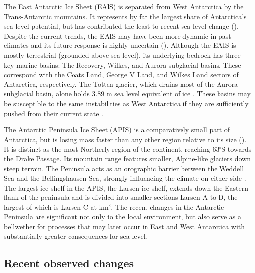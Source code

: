 The East Antarctic Ice Sheet (EAIS) is separated from West Antarctica by the Trans-Antarctic mountains. It represents by far the largest share of Antarctica's sea level potential, but has contributed the least to recent sea level change (). Despite the current trends, the EAIS may have been more dynamic in past climates and its future response is highly uncertain (\citealt{stokesResponseEastAntarctic2022}). Although the EAIS is mostly terrestrial (grounded above sea level), its underlying bedrock has three key marine basins: The Recovery, Wilkes, and Aurora subglacial basins. These correspond with the Coats Land, George V Land, and Wilkes Land sectors of Antarctica, respectively. The Totten glacier, which drains most of the Aurora subglacial basin, alone holds 3.89 m sea level equivalent of ice \citep{morlighemDeepGlacialTroughs2020}. These basins may be susceptible to the same instabilities as West Antarctica if they are sufficiently pushed from their current state \citep{mengelIcePlugPrevents2014,aitkenRepeatedLargescaleRetreat2016,golledgeEastAntarcticIce2017}.

The Antarctic Peninsula Ice Sheet (APIS) is a comparatively small part of Antarctica, but is losing mass faster than any other region relative to its size (). It is distinct as the most Northerly region of the continent, reaching 63$^\circ$S towards the Drake Passage. Its mountain range features smaller, Alpine-like glaciers down steep terrain. The Peninsula acts as an orographic barrier between the Weddell Sea and the Bellingshausen Sea, strongly influencing the climate on either side \citep{daviesAntarcticPeninsulaPresent2026}. The largest ice shelf in the APIS, the Larsen ice shelf, extends down the Eastern flank of the peninsula and is divided into smaller sections Larsen A to D, the largest of which is Larsen C at  km$^2$. The recent changes in the Antarctic Peninsula are significant not only to the local environment, but also serve as a bellwether for processes that may later occur in East and West Antarctica with substantially greater consequences for sea level.

\subsection{Recent observed changes}\label{section:recent-observed-changes}

